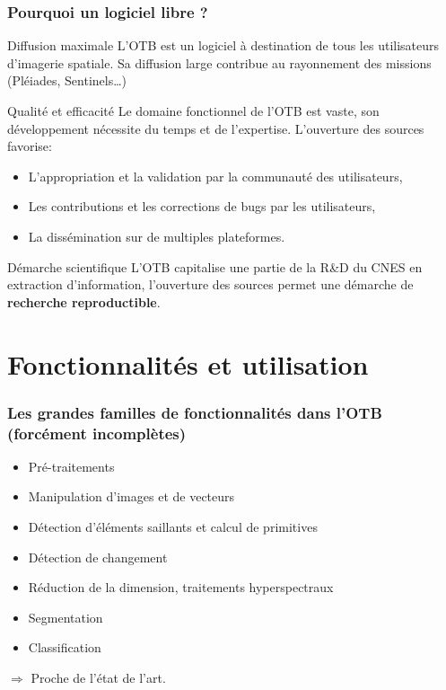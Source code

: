 \documentclass[8pt]{beamer}
\begin{document}
\begin{frame}
\frametitle{Pourquoi un logiciel libre ?}

\begin{block}{Diffusion maximale}
L'OTB est un logiciel à destination de tous les utilisateurs d'imagerie
spatiale. Sa diffusion large contribue au rayonnement des missions (Pléiades, Sentinels\ldots)
\end{block}

\begin{block}{Qualité et efficacité}
Le domaine fonctionnel de l'OTB est vaste, son développement nécessite du temps
et de l'expertise. L'ouverture des sources favorise:
\begin{itemize}
\item L'appropriation et la validation par la communauté des utilisateurs,
\item Les contributions et les corrections de bugs par les utilisateurs,
\item La dissémination sur de multiples plateformes.
\end{itemize}
\end{block}

\begin{block}{Démarche scientifique}
L'OTB capitalise une partie de la R\&D du CNES en extraction d'information, l'ouverture des sources permet une démarche de \textbf{recherche reproductible}.
\end{block}

\end{frame}

\section{Fonctionnalités et utilisation}

\begin{frame}
\frametitle{Les grandes familles de fonctionnalités dans l'OTB (forcément incomplètes)}
\begin{itemize}
  \item Pré-traitements
  \item Manipulation d'images et de vecteurs
  \item Détection d'éléments saillants et calcul de primitives
  \item Détection de changement
  \item Réduction de la dimension, traitements hyperspectraux
  \item Segmentation
  \item Classification
\end{itemize}
$\Rightarrow$ Proche de l'état de l'art.
\end{frame}
\end{document}
